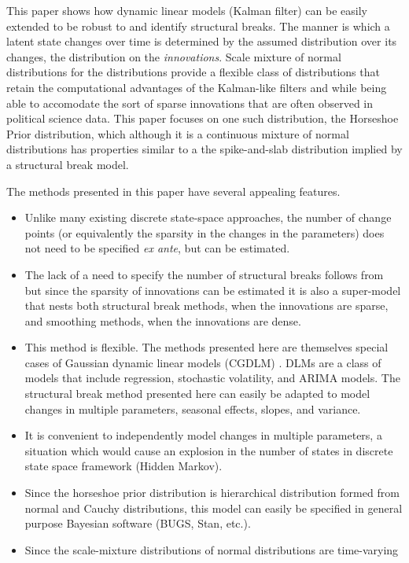 \documentclass{article}
\begin{document}
This paper shows how dynamic linear models (Kalman filter) can be easily extended to be robust to and identify structural breaks.
The manner is which a latent state changes over time is determined by the assumed distribution over its changes, the distribution on the \textit{innovations}.
Scale mixture of normal distributions for the distributions provide a flexible class of distributions that retain the computational advantages of the Kalman-like filters and while being able to accomodate the sort of sparse innovations that are often observed in political science data.
This paper focuses on one such distribution, the Horseshoe Prior distribution, which although it is a continuous mixture of normal distributions has properties similar to a the spike-and-slab distribution implied by a structural break model.

The methods presented in this paper have several appealing features.
\begin{itemize}
\item Unlike many existing discrete state-space approaches, the number of change points (or equivalently the sparsity in the changes in the parameters) does not need to be specified \textit{ex ante}, but can be estimated.
\item The lack of a need to specify the number of structural breaks follows from but since the sparsity of innovations can be estimated it is also a super-model that nests both structural break methods, when the innovations are sparse, and smoothing methods, when the innovations are dense.
\item This method is flexible.
  The methods presented here are themselves special cases of Gaussian dynamic linear models (CGDLM) \parencites{WestHarrison1997}{DurbinKoopman2001}{CommandeurKoopman2007}{ShumwayStoffer2010}.
  DLMs are a class of models that include regression, stochastic volatility, and ARIMA models.
  The structural break method presented here can easily be adapted to model changes in multiple parameters, seasonal effects, slopes, and variance.
\item It is convenient to independently model changes in multiple parameters, a situation which would cause an explosion in the number of states in discrete state space framework (Hidden Markov).
\item Since the horseshoe prior distribution is hierarchical distribution formed from normal and Cauchy distributions, this model can easily be specified in general purpose Bayesian software (BUGS, Stan, etc.).
\item Since the scale-mixture distributions of normal distributions are time-varying 
\end{itemize}
\end{document}
